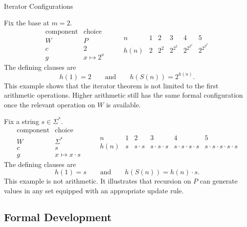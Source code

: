 \begin{topicbox}{Iterator Configurations}
\begin{remark*}
Fix the base at $m=2$.
\[
\begin{array}{c|c}
\text{component} & \text{choice}\\ \hline
W & P\\
c & 2\\
g & x\mapsto 2^x
\end{array}
\qquad
\begin{array}{c|ccccc}
n & 1 & 2 & 3 & 4 & 5\\ \hline
h(n) & 2 & 2^2 & 2^{2^2} & 2^{2^{2^2}} & 2^{2^{2^{2^2}}}
\end{array}
\]
The defining clauses are
\[
h(1)=2
\qquad\text{and}\qquad
h(S(n))=2^{h(n)}.
\]
This example shows that the iterator theorem is not limited to the first
arithmetic operations. Higher arithmetic still has the same formal
configuration once the relevant operation on $W$ is available.
\end{remark*}

\begin{remark*}
Fix a string $s\in \Sigma^*$.
\[
\begin{array}{c|c}
\text{component} & \text{choice}\\ \hline
W & \Sigma^*\\
c & s\\
g & x\mapsto x\cdot s
\end{array}
\qquad
\begin{array}{c|ccccc}
n & 1 & 2 & 3 & 4 & 5\\ \hline
h(n) & s & s\cdot s & s\cdot s\cdot s &
s\cdot s\cdot s\cdot s & s\cdot s\cdot s\cdot s\cdot s
\end{array}
\]
The defining clauses are
\[
h(1)=s
\qquad\text{and}\qquad
h(S(n))=h(n)\cdot s.
\]
This example is not arithmetic. It illustrates that recursion on $P$ can
generate values in any set equipped with an appropriate update rule.
\end{remark*}
\end{topicbox}

\subsection*{Formal Development}

